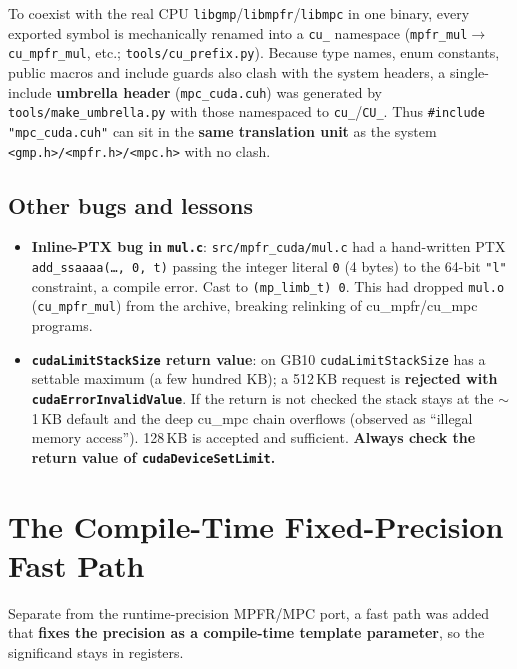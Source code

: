 \documentclass[uplatex,dvipdfmx,a4paper,11pt]{jsarticle}
\newcommand{\code}[1]{\texttt{#1}}
\begin{document}
To coexist with the real CPU \code{libgmp}/\code{libmpfr}/\code{libmpc} in one
binary, every exported symbol is mechanically renamed into a \code{cu\_}
namespace (\code{mpfr\_mul}$\to$\code{cu\_mpfr\_mul}, etc.;
\code{tools/cu\_prefix.py}). Because type names, enum constants, public macros and
include guards also clash with the system headers, a single-include
\textbf{umbrella header} (\code{mpc\_cuda.cuh}) was generated by
\code{tools/make\_umbrella.py} with those namespaced to \code{cu\_}/\code{CU\_}.
Thus \code{\#include "mpc\_cuda.cuh"} can sit in the \textbf{same translation
unit} as the system \code{<gmp.h>/<mpfr.h>/<mpc.h>} with no clash.

\subsection{Other bugs and lessons}

\begin{itemize}
\item \textbf{Inline-PTX bug in \code{mul.c}}: \code{src/mpfr\_cuda/mul.c} had a
      hand-written PTX \code{add\_ssaaaa(\dots, 0, t)} passing the integer literal
      \code{0} (4 bytes) to the 64-bit \code{"l"} constraint, a compile error.
      Cast to \code{(mp\_limb\_t)\,0}. This had dropped \code{mul.o}
      (\code{cu\_mpfr\_mul}) from the archive, breaking relinking of cu\_mpfr/cu\_mpc
      programs.
\item \textbf{\code{cudaLimitStackSize} return value}: on GB10
      \code{cudaLimitStackSize} has a settable maximum (a few hundred KB); a
      512\,KB request is \textbf{rejected with \code{cudaErrorInvalidValue}}. If the
      return is not checked the stack stays at the $\sim$1\,KB default and the deep
      cu\_mpc chain overflows (observed as ``illegal memory access''). 128\,KB is
      accepted and sufficient. \textbf{Always check the return value of
      \code{cudaDeviceSetLimit}.}
\end{itemize}

\section{The Compile-Time Fixed-Precision Fast Path}
\label{sec:fixed}

Separate from the runtime-precision MPFR/MPC port, a fast path was added that
\textbf{fixes the precision as a compile-time template parameter}, so the
significand stays in registers.
\end{document}

